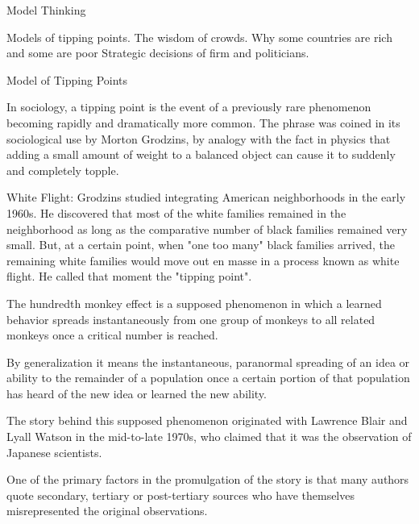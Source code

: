 Model Thinking



Models of tipping points.
The wisdom of crowds.
Why some countries are rich and some are poor
Strategic decisions of firm and politicians.





Model of Tipping Points


In sociology, a tipping point is the event of a previously rare phenomenon becoming rapidly and dramatically more common. The phrase was coined in its sociological use by Morton Grodzins, by analogy with the fact in physics that adding a small amount of weight to a balanced object can cause it to suddenly and completely topple.


White Flight: Grodzins studied integrating American neighborhoods in the early 1960s. He discovered that most of the white families remained in the neighborhood as long as the comparative number of black families remained very small. But, at a certain point, when "one too many" black families arrived, the remaining white families would move out en masse in a process known as white flight. He called that moment the "tipping point". 





The hundredth monkey effect is a supposed phenomenon in which a learned behavior spreads instantaneously from one group of monkeys to all related monkeys once a critical number is reached. 


By generalization it means the instantaneous, paranormal spreading of an idea or ability to the remainder of a population once a certain portion of that population has heard of the new idea or learned the new ability. 


The story behind this supposed phenomenon originated with Lawrence Blair and Lyall Watson in the mid-to-late 1970s, who claimed that it was the observation of Japanese scientists. 


One of the primary factors in the promulgation of the story is that many authors quote secondary, tertiary or post-tertiary sources who have themselves misrepresented the original observations.

